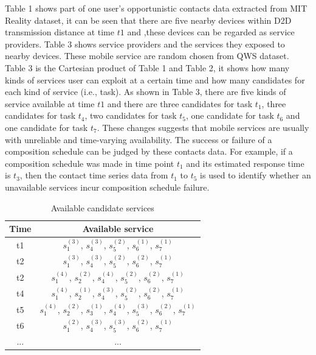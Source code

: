 \documentclass[journal]{IEEEtran}
\begin{document}
Table 1 shows part of one user's opportunistic contacts data extracted from MIT Reality dataset, it can be seen that there are five nearby devices within D2D transmission distance at time $t1$ and ,these devices can be regarded as service providers. Table 3 shows service providers and the services they exposed to nearby devices. These mobile service are random chosen from QWS dataset. Table 3 is the Cartesian product of Table 1 and Table 2, it shows how many kinds of services user can exploit at a certain time and how many candidates for each kind of service (i.e., task). As shown in Table 3, there are five kinds of service available at time $t1$ and there are three candidates for task $t_1$, three candidates for task $t_4$, two candidates for task $t_5$, one candidate for task $t_6$ and one candidate for task $t_7$. These changes suggests that mobile services are usually with unreliable and time-varying availability.
The success or failure of a composition schedule can be judged by these contacts data. For example, if a composition schedule was made in time point $t_1$ and its estimated response time is $t_3$, then the contact time series data from $t_1$ to $t_5$ is used to identify whether an unavailable services incur composition schedule failure.

\begin{table}[!t]
\renewcommand{\arraystretch}{1.8}
\caption{Available candidate services}
\label{Available candidate services}
\centering
\begin{tabular}{c c}
\hline
\bfseries Time & \bfseries Available service\\
\hline
t1     & $s_1^{(3)}$, $s_4^{(3)}$, $s_5^{(2)}$, $s_6^{(1)}$, $s_7^{(1)}$ \\
t2     & $s_1^{(3)}$, $s_4^{(3)}$, $s_5^{(2)}$, $s_6^{(2)}$, $s_7^{(1)}$ \\
t2     & $s_1^{(4)}$, $s_2^{(2)}$, $s_4^{(4)}$, $s_5^{(2)}$, $s_6^{(2)}$, $s_7^{(1)}$ \\
t4     & $s_1^{(4)}$, $s_2^{(1)}$, $s_4^{(3)}$, $s_5^{(2)}$, $s_6^{(2)}$, $s_7^{(1)}$ \\
t5     & $s_1^{(4)}$, $s_2^{(2)}$, $s_3^{(1)}$, $s_4^{(4)}$, $s_5^{(3)}$, $s_6^{(2)}$, $s_7^{(1)}$ \\
t6     & $s_1^{(2)}$, $s_4^{(3)}$, $s_5^{(3)}$, $s_6^{(2)}$, $s_7^{(1)}$ \\
... & ...\\
\hline
\end{tabular}
\end{table}
\end{document}
